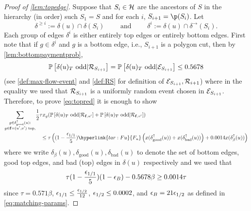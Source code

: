 \begin{proof}[Proof of \cref{lem:topedge}]
Suppose that $S_i \in\mathcal{H}$ are the ancestors of $S$ in the hierarchy (in order) such $S_1=S$ and for each $i$, $S_{i+1}=\p(S_i)$.
Let
$$\delta^{\ge i}:= \delta (u) \cap \delta (S_i) \quad \quad \text{ and }\quad \quad  \delta^i := \delta(u) \cap \delta ^\rightarrow (S_i).$$
Each group of edges $\delta^i$ is either entirely top edges or entirely bottom edges. 
First note that if $g\in \delta^i$ and $g$ is a bottom edge, i.e., $S_{i+1}$ is a polygon cut, then by \cref{lem:bottompaymentprob},  
$${\mathbb{P}}\left[\delta (u)_T\text{ odd} | {\mathcal{R}}_{S_{i+1}}\right] = {\mathbb{P}}\left[\delta(u)_T\text{ odd} | {\cal E}_{S_{i+1}}\right] \le 0.5678$$
(see \cref{def:max-flow-event} and \cref{def:RS} for definition of ${\cal E}_{S_{i+1}},{\mathcal{R}}_{i+1}$) where in the equality we used that ${\mathcal{R}}_{S_{i+1}}$ is a uniformly random event chosen in ${\cal E}_{S_{i+1}}$.
Therefore, to prove \cref{eq:topred} it is enough to show
\begin{align}
\sum_{\substack{ g\in \delta ^\uparrow_\text{good}(u):\\ g\in \bbf=(u',v') \text{ top},\\ }} &\frac{1}{2} \tau x_g  (\P{\delta(u)_T\text{ odd}|\cR_{\bbf,u'}} + \P{\delta(u)_T\text{ odd} | \cR_{\bbf,v'}}) \notag\\
&\quad 
\leq \tau\left((1-\frac{\eps_{1/1}}{5})  \hyperlink{tar:Fu}{F_u}\left( x(\delta^\uparrow_\text{good}(u)) +x(\delta^\uparrow _\text{bad}(u))\right) + 0.0014 x(\delta^\uparrow_\beta(u))\right)\label{payineq}	
\end{align}
where we write $\delta_\beta(u),\delta_\text{good}(u), \delta_\text{bad}(u)$ to denote the set of bottom edges, good top edges, and bad (top) edges in $\delta(u)$ respectively and we used that 
$$\tau(1-\frac{{\epsilon}_{1/1}}{5})(1-{\epsilon}_B)-0.5678\beta \geq 0.0014\tau$$%
since $\tau=0.571\beta$, ${\epsilon}_{1/1}\leq \frac{{\epsilon}_{1/2}}{12}$, ${\epsilon}_{1/2}\leq 0.0002$, and ${\epsilon}_B = 21{\epsilon}_{1/2}$ as defined in \ref{eq:matching-params}.


\end{proof}
